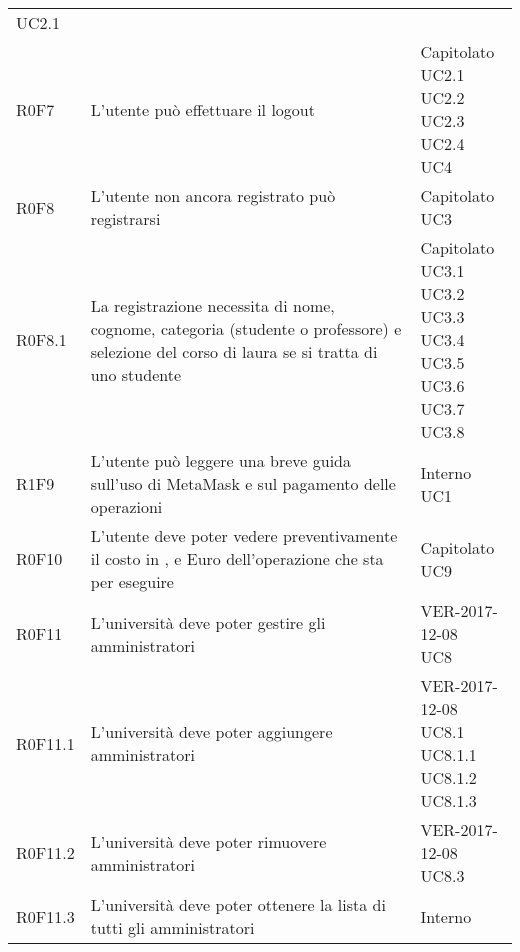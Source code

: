 \documentclass[AnalisiDeiRequisiti.tex]{subfiles}
\begin{document}
\begin{longtable}[H]{p{2cm}p{5.2cm}p{5cm}}
{		UC2.1
	} \\  
	R0F7 &  L'utente può effettuare il logout & \makecell[tl]{
		Capitolato \\ 
		UC2.1  \\
		UC2.2 \\
		UC2.3 \\
		UC2.4 \\ 
		UC4
	} \\  
	R0F8 &  L'utente non ancora registrato può registrarsi & \makecell[tl]{
		Capitolato \\ 
		UC3
	} \\  
	R0F8.1 &  La registrazione necessita di nome, cognome, categoria (studente o professore) e selezione del corso di laura se si tratta di uno studente & \makecell[tl]{
		Capitolato \\
		UC3.1 \\
		UC3.2 \\
		UC3.3 \\
		UC3.4 \\
		UC3.5 \\
		UC3.6 \\
		UC3.7 \\
		UC3.8
	} \\  
	R1F9 &  L'utente può leggere una breve guida sull'uso di MetaMask e sul pagamento delle operazioni & \makecell[tl]{
		Interno \\ 
		UC1
	} \\  
	R0F10 &  L'utente deve poter vedere preventivamente il costo in \citGloss{Gas}, \citGloss{Ether} e Euro dell'operazione che sta per eseguire & \makecell[tl]{
		Capitolato \\
		UC9
	} \\  
	R0F11 &  L'università deve poter gestire gli amministratori & \makecell[tl]{
		VER-2017-12-08 \\
		UC8
	} \\  
	R0F11.1 &  L'università deve poter aggiungere amministratori & \makecell[tl]{
		VER-2017-12-08 \\
		UC8.1 \\
		UC8.1.1 \\ 
		UC8.1.2 \\
		UC8.1.3
	} \\  
	R0F11.2 &  L'università deve poter rimuovere amministratori & \makecell[tl]{
		VER-2017-12-08 \\
		UC8.3
	} \\  
	R0F11.3 &  L'università deve poter ottenere la lista di tutti gli amministratori & \makecell[tl]{
		Interno \\
}
\end{longtable}
\end{document}
